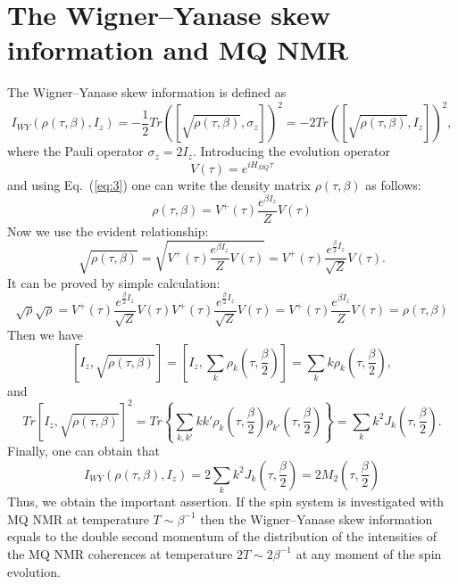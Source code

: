 \documentclass[preprint,12pt]{elsarticle}
\begin{document}
\section{The Wigner--Yanase skew information and MQ NMR}
\label{sec:3}
The Wigner--Yanase skew information is defined as~\cite{1,2,3}
\begin{equation}
    \label{eq:14}
        I_{WY}(\rho(\tau,\beta),I_z) = -\frac{1}{2}
            Tr([\sqrt{\rho(\tau,\beta)},\sigma_z])^2 =
                -2Tr([\sqrt{\rho(\tau,\beta)},I_z])^2,
\end{equation}
where the Pauli operator $\sigma_z=2I_z$.
Introducing the evolution operator
\begin{equation}
    \label{eq:15}
        V(\tau) = e^{iH_{MQ}\tau}
\end{equation}
and using Eq.~(\ref{eq:3}) one can write the density matrix $\rho(\tau,\beta)$ as follows:
\begin{equation}
    \label{eq:16}
        \rho(\tau,\beta) = V^+(\tau) \frac{e^{\beta I_z}}{Z}V(\tau)
\end{equation}
Now we use the evident relationship:
\begin{equation}
    \label{eq:17}
        \sqrt{\rho(\tau,\beta)} =
            \sqrt{V^+(\tau)\frac{e^{\beta I_z}}{Z}V(\tau)} =
                V^+(\tau) \frac{e^{\frac{\beta}{2}I_z}}{\sqrt{Z}}V(\tau).
\end{equation}
It can be proved by simple calculation:
\begin{equation}
    \label{eq:18}
        \sqrt{\rho}\sqrt{\rho} =
						V^+(\tau)\frac{e^{\frac{\beta}{2}I_z}}{\sqrt{Z}}
                V(\tau)V^+(\tau)\frac{e^{\frac{\beta}{2}I_z}}{\sqrt{Z}}V(\tau) =
						V^+(\tau)\frac{e^{\beta I_z}}{Z}V(\tau) =
        \rho(\tau,\beta)
\end{equation}
%
Then we have
%
\begin{equation} \label{eq:19}
    \left[I_z,\sqrt{\rho(\tau,\beta)}\right]
    = \left[I_z, \sum_k \rho_k \left(\tau, \frac{\beta}{2}\right)\right]
    = \sum_k k\rho_k \left(\tau, \frac{\beta}{2}\right),
\end{equation}
%
and
%
\begin{equation} \label{eq:20}
	Tr\left[I_z,\sqrt{\rho(\tau,\beta)} \right]^2
	= Tr\left\{\sum_{k,k'}kk'
		\rho_k\left(\tau,\frac{\beta}{2}\right)
		\rho_{k'}\left(\tau,\frac{\beta}{2}\right)
	\right\}
	= \sum_k k^2 J_k\left(\tau,\frac{\beta}{2}\right).
\end{equation}
%
Finally, one can obtain that
%
\begin{equation} \label{eq:21}
    I_{WY}\left(\rho(\tau, \beta), I_z\right)
    = 2\sum_k k^2 J_k\left(\tau, \frac{\beta}{2}\right)
    = 2M_2\left(\tau, \frac{\beta}{2}\right)
\end{equation}
%
Thus, we obtain the important assertion.
If the spin system is investigated with MQ NMR at temperature $T\sim\beta^{-1}$ then the Wigner--Yanase skew information equals to the double second momentum of the distribution of the intensities of the MQ NMR coherences at temperature $2T \sim 2\beta^{-1}$ at any moment of the spin evolution.
\end{document}
